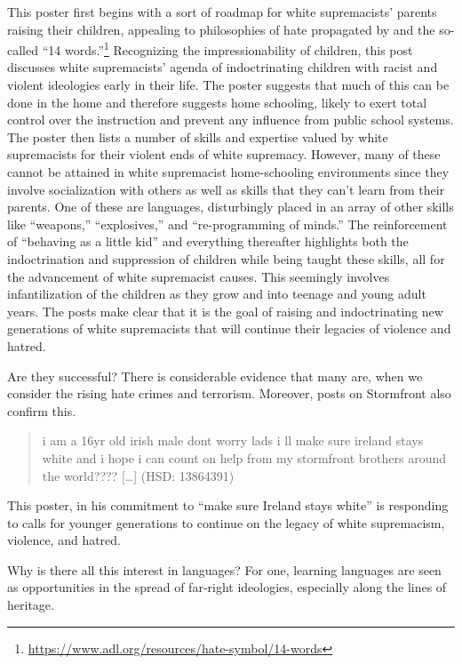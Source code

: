 \documentclass[output=paper,colorlinks,citecolor=brown]{langscibook}
\begin{document}
\noindent This poster first begins with a sort of roadmap for white supremacists' parents raising their children, appealing to philosophies of hate propagated by  and the so-called “14 words.”\footnote{\url{https://www.adl.org/resources/hate-symbol/14-words}} Recognizing the impressionability of children, this post discusses white supremacists' agenda of indoctrinating children with racist and violent ideologies early in their life. The poster suggests that much of this can be done in the home and therefore suggests home schooling, likely to exert total control over the instruction and prevent any influence from public school systems. The poster then lists a number of skills and expertise valued by white supremacists for their violent ends of white supremacy. However, many of these cannot be attained in white supremacist home-schooling environments since they involve socialization with others as well as skills that they can't learn from their parents. One of these are languages, disturbingly placed in an array of other skills like ``weapons,'' ``explosives,'' and ``re-programming of minds.'' The reinforcement of ``behaving as a little kid'' and everything thereafter highlights both the indoctrination and suppression of children while being taught these skills, all for the advancement of white supremacist causes. This seemingly involves infantilization of the children as they grow and into teenage and young adult years. The posts make clear that it is the goal of raising and indoctrinating new generations of white supremacists that will continue their legacies of violence and hatred.

Are they successful? There is considerable evidence that many are, when we consider the rising hate crimes and terrorism. Moreover, posts on Stormfront also confirm this.

\begin{quote}
i am a 16yr old irish male dont worry lads i ll make sure ireland stays white and i hope i can count on help from my stormfront brothers around the world???? {[}\ldots{]} (HSD: 13864391) 
\end{quote}

\noindent This poster, in his commitment to ``make sure Ireland stays white'' is responding to calls for younger generations to continue on the legacy of white supremacism, violence, and hatred.

Why is there all this interest in languages? For one, learning languages are seen as opportunities in the spread of far-right ideologies, especially along the lines of heritage.
\end{document}
